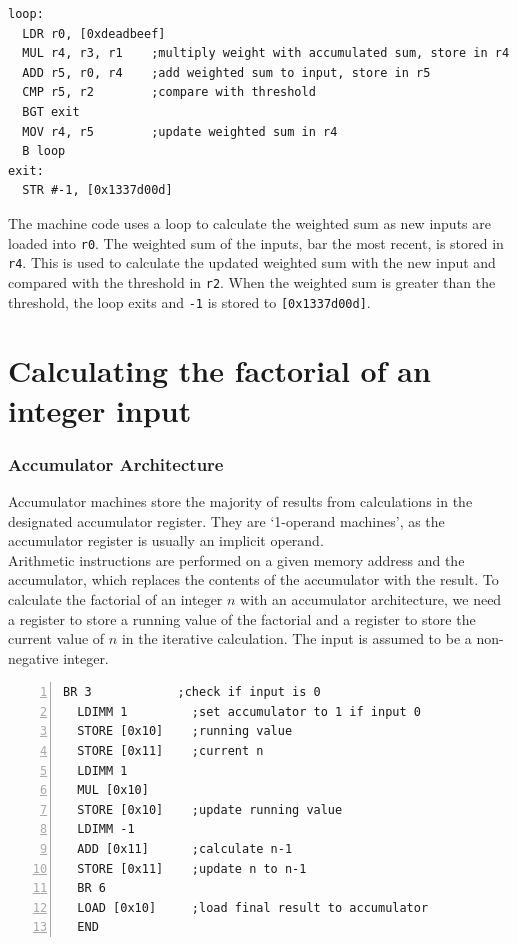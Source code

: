 \documentclass[a4paper, 12pt, oneside]{book}
\begin{document}
\begin{verbatim}
loop:
  LDR r0, [0xdeadbeef]
  MUL r4, r3, r1    ;multiply weight with accumulated sum, store in r4
  ADD r5, r0, r4    ;add weighted sum to input, store in r5
  CMP r5, r2        ;compare with threshold
  BGT exit
  MOV r4, r5        ;update weighted sum in r4
  B loop
exit:
  STR #-1, [0x1337d00d]
\end{verbatim}

The machine code uses a loop to calculate the weighted sum as new inputs are loaded into \texttt{r0}. The weighted sum of the inputs, bar the most recent, is stored in \texttt{r4}. This is used to calculate the updated weighted sum with the new input and compared with the threshold in \texttt{r2}. When the weighted sum is greater than the threshold, the loop exits and \texttt{-1} is stored to \texttt{[0x1337d00d]}.


\section{Calculating the factorial of an integer input}

\subsubsection{Accumulator Architecture}

Accumulator machines store the majority of results from calculations in the designated accumulator register. They are `1-operand machines', as the accumulator register is usually an implicit operand.\\

Arithmetic instructions are performed on a given memory address and the accumulator, which replaces the contents of the accumulator with the result. To calculate the factorial of an integer $n$ with an accumulator architecture, we need a register to store a running value of the factorial and a register to store the current value of $n$ in the iterative calculation. The input is assumed to be a non-negative integer.

\begin{Verbatim}[numbers=left,xleftmargin=5mm]
  BR 3            ;check if input is 0
  LDIMM 1         ;set accumulator to 1 if input 0
  STORE [0x10]    ;running value
  STORE [0x11]    ;current n
  LDIMM 1
  MUL [0x10]
  STORE [0x10]    ;update running value
  LDIMM -1
  ADD [0x11]      ;calculate n-1
  STORE [0x11]    ;update n to n-1
  BR 6
  LOAD [0x10]     ;load final result to accumulator
  END
\end{Verbatim}
\end{document}
